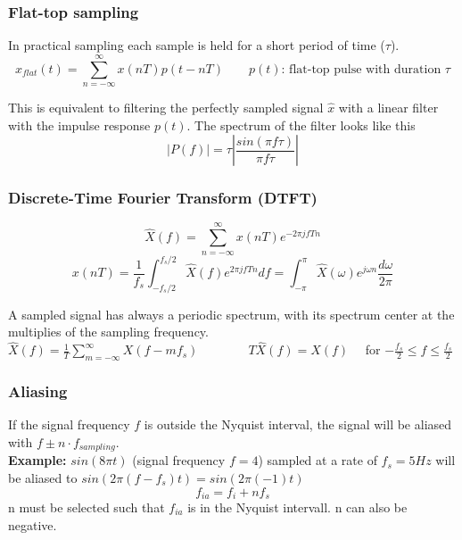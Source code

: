\begin{center}

\end{center}

\subsubsection{Flat-top sampling }
In practical sampling each sample is held for a short period of time ($\tau$).
\[ x_{flat}(t) =  \sum_{n=-\infty}^{\infty}x(nT)p(t - nT) \qquad p(t) \text{: flat-top pulse with duration } \tau \]

This is equivalent to filtering the perfectly sampled signal $\hat{x}$ with a linear filter with the impulse response $p(t)$.
The spectrum of the filter looks like this
\[ |P(f)| = \tau \left| \frac{sin(\pi f \tau)}{\pi f \tau} \right| \]

\subsubsection{Discrete-Time Fourier Transform (DTFT)}
\[
	\hat{X}(f) = \sum_{n=-\infty}^{\infty} x(nT)e^{-2\pi jfTn}
\]
\[
	x(nT) = \frac{1}{f_s} \int_{-f_s/2}^{f_s/2}\hat{X}(f)e^{2\pi jfTn}df = \int_{-\pi}^{\pi}\hat{X}(\omega)e^{j\omega n} \frac{d \omega}{2 \pi}
\]

  A sampled signal has always a periodic spectrum, with its spectrum center at the multiplies of the sampling frequency.\\
  $\hat{X}(f) = \frac{1}{T}\sum\limits_{m=-\infty}^{\infty}X(f-mf_s) \qquad \qquad
  T\hat{X}(f) = X(f) \quad$ for $-\frac{f_s}{2} \leq f \leq \frac{f_s}{2}$





\subsubsection{Aliasing}
If the signal frequency $f$ is outside the Nyquist interval, the signal will be
aliased with $f \pm n \cdot f_{sampling}$.\\

\textbf{Example:} $sin(8\pi t)$ (signal frequency $f=4$) sampled at a rate of
$f_s=5Hz$ will be aliased to $sin(2\pi (f-f_s) t) = sin(2\pi (-1) t)$
\[ f_{ia} = f_i + nf_s \]
n must be selected such that $f_{ia}$ is in the Nyquist intervall. n can also be negative.\\


